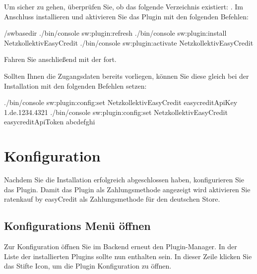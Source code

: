 \documentclass[a4paper,10pt,openany,oneside,ngerman]{sphinxmanual}
\begin{document}
Um sicher zu gehen, überprüfen Sie, ob das folgende Verzeichnis existiert: . Im Anschluss installieren und aktivieren Sie das Plugin mit den folgenden Befehlen:

%
\begin{sphinxVerbatim}[commandchars=\\\{\}]
  /sw\PYGZhy{}base\PYGZhy{}dir
 ./bin/console sw:plugin:refresh
 ./bin/console sw:plugin:install NetzkollektivEasyCredit
 ./bin/console sw:plugin:activate NetzkollektivEasyCredit
\end{sphinxVerbatim}

Fahren Sie anschließend mit der {\hyperref[\detokenize{configuration:configuration}]{}} fort.

Sollten Ihnen die Zugangsdaten bereits vorliegen, können Sie diese gleich bei der Installation mit den folgenden Befehlen setzen:

%
\begin{sphinxVerbatim}[commandchars=\\\{\}]
 ./bin/console sw:plugin:config:set NetzkollektivEasyCredit easycreditApiKey 1.de.1234.4321
 ./bin/console sw:plugin:config:set NetzkollektivEasyCredit easycreditApiToken abc\PYGZhy{}def\PYGZhy{}ghi
\end{sphinxVerbatim}


\chapter{Konfiguration}
\label{\detokenize{configuration:konfiguration}}\label{\detokenize{configuration:configuration}}\label{\detokenize{configuration::doc}}
Nachdem Sie die Installation erfolgreich abgeschlossen haben, konfigurieren Sie das Plugin. Damit das Plugin als Zahlungsmethode angezeigt wird aktivieren Sie ratenkauf by easyCredit als Zahlungsmethode für den deutschen Store.


\section{Konfigurations Menü öffnen}
\label{\detokenize{configuration:konfigurations-menu-offnen}}
Zur Konfiguration öffnen Sie im Backend erneut den Plugin-Manager. In der Liste der installierten Plugins sollte nun  enthalten sein.
In dieser Zeile klicken Sie das Stifte Icon, um die Plugin Konfiguration zu öffnen.
\end{document}

